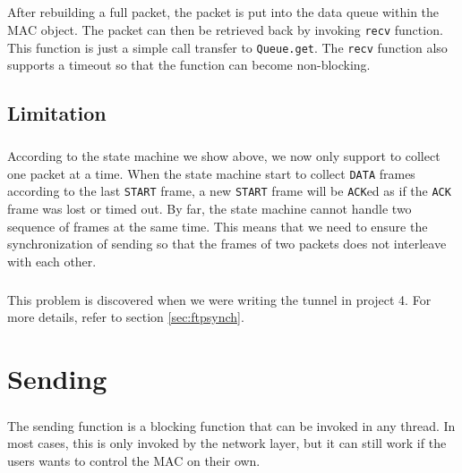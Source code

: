         {\hspace{4em}
        }

        \subparagraph{}
        After rebuilding a full packet, the packet is put into the data queue within the MAC object. The packet can then be retrieved back by invoking {\tt recv} function. This function is just a simple call transfer to {\tt Queue.get}. The {\tt recv} function also supports a timeout so that the function can become non-blocking.

    \subsection{Limitation}\label{sec:lim}
    
        \subparagraph{}
        According to the state machine we show above, we now only support to collect one packet at a time. When the state machine start to collect \texttt{DATA} frames according to the last \texttt{START} frame, a new \texttt{START} frame will be \texttt{ACK}ed as if the \texttt{ACK} frame was lost or timed out. By far, the state machine cannot handle two sequence of frames at the same time. This means that we need to ensure the synchronization of sending so that the frames of two packets does not interleave with each other.
        \subparagraph{}
        This problem is discovered when we were writing the tunnel in project 4. For more details, refer to section \ref{sec:ftpsynch}.

\section{Sending}
    \subparagraph{}
    The sending function is a blocking function that can be invoked in any thread. In most cases, this is only invoked by the network layer, but it can still work if the users wants to control the MAC on their own.

